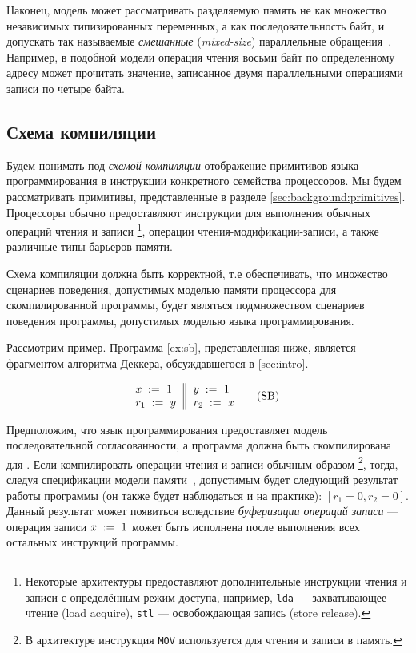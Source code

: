 Наконец, модель может рассматривать разделяемую память 
не как множество независимых типизированных переменных, 
а как последовательность байт, и допускать 
так называемые \emph{смешанные} (\emph{mixed-size}) 
параллельные обращения~\cite{Flur-al:POPL17}. 
Например, в подобной модели операция чтения восьми байт по определенному адресу
может прочитать значение, записанное двумя параллельными 
операциями записи по четыре байта.

\subsection{Схема компиляции}
\label{sec:background:compile}

Будем понимать под \emph{схемой компиляции} отображение
примитивов языка программирования в инструкции 
конкретного семейства процессоров.  
Мы будем рассматривать примитивы, представленные в 
разделе \cref{sec:background:primitives}.
Процессоры обычно предоставляют 
инструкции для выполнения обычных операций чтения и записи%
\footnote{Некоторые архитектуры
предоставляют дополнительные инструкции чтения и 
записи с определённым режим доступа, например,   \texttt{lda} --- захватывающее чтение (load acquire), 
\texttt{stl} --- освобождающая запись (store release).}, 
операции чтения-модификации-записи, а 
также различные типы барьеров памяти.

Схема компиляции должна быть корректной, т.е
обеспечивать, что множество сценариев поведения, допустимых 
моделью памяти процессора для скомпилированной программы, будет 
являться подмножеством сценариев поведения программы, допустимых 
моделью языка программирования. 

Рассмотрим пример. 
Программа \ref{ex:sb}, представленная ниже, является 
фрагментом алгоритма Деккера, обсуждавшегося  в \cref{sec:intro}.

\begin{equation*}
\inarrII{
   \writeInst{}{x}{1}   \\
   \readInst{}{r_1}{y}  \\
}{
  \writeInst{}{y}{1}   \\
  \readInst{}{r_2}{x}  \\
}
\tag{SB}\label{ex:sb}
\end{equation*}


Предположим, что язык программирования предоставляет 
модель последовательной согласованности, а программа
должна быть скомпилирована для \Intel. 
Если компилировать операции чтения и записи 
обычным образом \Intel \footnote{
В архитектуре \Intel инструкция \texttt{MOV} 
используется для чтения и записи в память.},
тогда, следуя спецификации модели памяти~\Intel, допустимым будет следующий результат работы программы (он также будет наблюдаться и на практике):
${[r_1=0, r_2=0]}$. 
Данный результат может появиться вследствие 
\emph{буферизации операций записи} --- 
операция записи ${x\;:=_{}\;1}$ может быть исполнена после выполнения всех остальных инструкций программы.


